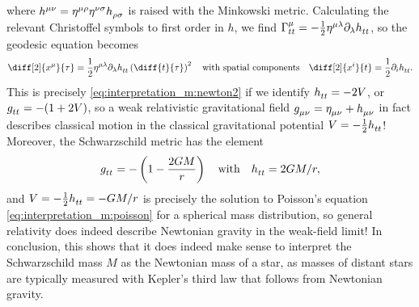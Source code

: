 where $h\indices{^\mu^\nu} = \eta\indices{^\mu^\rho} \eta\indices{^\nu^\sigma} h\indices{_\rho_\sigma}$ is raised with the Minkowski metric.
Calculating the relevant Christoffel symbols to first order in $h$, we find $\Gamma^\mu_{tt} = -\frac{1}{2} \eta\indices{^\mu^\lambda} \partial_\lambda h\indices{_t_t}$, so the geodesic equation becomes
\begin{equation*}
	\diff[2]{x^\mu}{\tau} = \frac{1}{2} \eta\indices{^\mu^\lambda} \partial_\lambda h\indices{_t_t} \left( \diff{t}{\tau} \right)^2
	\quad \text{with spatial components} \quad
	\diff[2]{x^i}{t} = \frac{1}{2} \partial_i h\indices{_t_t} .
\end{equation*}
This is precisely \cref{eq:interpretation_m:newton2} if we identify $h\indices{_t_t} = -2 V$, or $g\indices{_t_t} = -(1+2V)$, so a weak relativistic gravitational field $g\indices{_\mu_\nu} = \eta\indices{_\mu_\nu} + h\indices{_\mu_\nu}$ in fact describes classical motion in the classical gravitational potential $V = -\frac{1}{2} h\indices{_t_t}$!
Moreover, the Schwarzschild metric has the element
\begin{equation}
	g\indices{_t_t} = - \left( 1 - \frac{2 G M}{r} \right)
	\quad \text{with} \quad
	h\indices{_t_t} = 2GM/r ,
	\label{eq:weak_field_limit:schwarzschild_metric_tt}
\end{equation}
and $V = -\frac{1}{2} h\indices{_t_t} = -G M / r$ is precisely the solution to Poisson's equation \eqref{eq:interpretation_m:poisson} for a spherical mass distribution, so general relativity does indeed describe Newtonian gravity in the weak-field limit!
In conclusion, this shows that it does indeed make sense to interpret the Schwarzschild mass $M$ as the Newtonian mass of a star, as masses of distant stars are typically measured with Kepler's third law that follows from Newtonian gravity. \cite[box 23.1]{ref:mtw}

